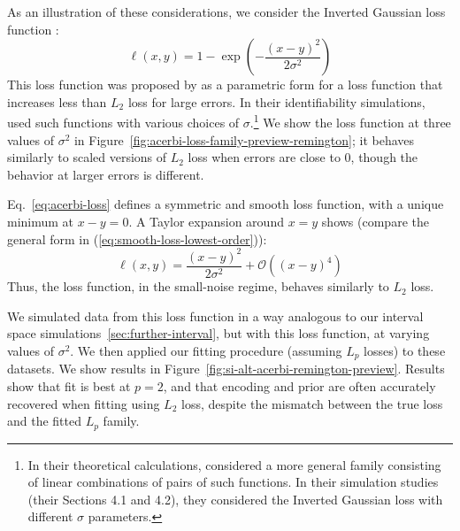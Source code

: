\documentclass[si.tex]{subfiles}
\begin{document}
As an illustration of these considerations, we consider the Inverted Gaussian loss function \citep{Krding2004TheLF, Acerbi2014AFF}:
\begin{equation}\label{eq:acerbi-loss}
\ell(x,y) = 1 - \exp(-\frac{(x-y)^2}{2\sigma^2})
\end{equation}
This loss function was proposed by \citet{Krding2004TheLF} as a parametric form for a loss function that increases less than $L_2$ loss for large errors.
In their identifiability simulations, \citet{Acerbi2014AFF} used such functions with various choices of $\sigma$.\footnote{In their theoretical calculations, \citet{Acerbi2014AFF} considered a more general family consisting of linear combinations of pairs of such functions. In their simulation studies (their Sections 4.1 and 4.2), they considered the Inverted Gaussian loss with different $\sigma$ parameters.}
We show the loss function at three values of $\sigma^2$ in Figure~\ref{fig:acerbi-loss-family-preview-remington}; it behaves similarly to scaled versions of $L_2$ loss when errors are close to 0, though the behavior at larger errors is different.

Eq.~\ref{eq:acerbi-loss} defines a symmetric and smooth loss function, with a unique minimum at $x-y=0$.
A Taylor expansion around $x=y$ shows (compare the general form in (\ref{eq:smooth-loss-lowest-order})):
\begin{equation}
\ell(x,y) = \frac{(x-y)^2}{2\sigma^2} + \mathcal{O}((x-y)^4)
\end{equation}
Thus, the loss function, in the small-noise regime, behaves similarly to $L_2$ loss.

We simulated data from this loss function in a way analogous to our interval space simulations~\ref{sec:further-interval}, but with this loss function, at varying values of $\sigma^2$.
We then applied our fitting procedure (assuming $L_p$ losses) to these datasets. We show results in Figure~\ref{fig:si-alt-acerbi-remington-preview}.
Results show that fit is best at $p=2$, and that encoding and prior are often accurately recovered when fitting using $L_2$ loss, despite the mismatch between the true loss and the fitted $L_p$ family.




\end{document}

